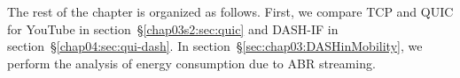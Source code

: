 The rest of the chapter is organized as follows. First, we compare \ac{TCP} and \ac{QUIC} for YouTube in section~\S\ref{chap03s2:sec:quic} and \ac{DASH-IF} in section~\S\ref{chap04:sec:qui-dash}. In section~\S\ref{sec:chap03:DASHinMobility}, we perform the analysis of energy consumption due to \ac{ABR} streaming.

